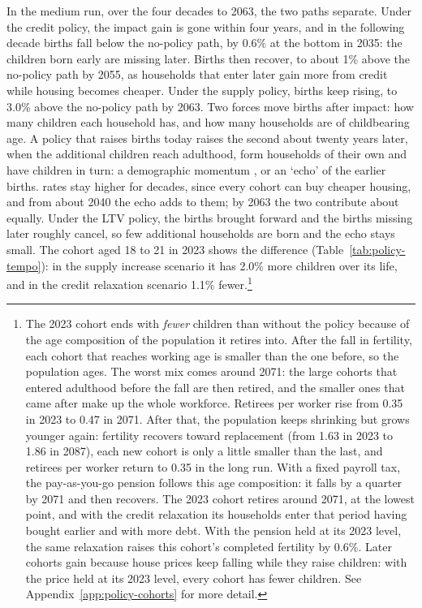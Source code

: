 In the medium run, over the four decades to 2063, the two paths separate.
Under the credit policy, the impact gain is gone within four years, and in the following decade
births fall below the no-policy path, by 0.6\% at the bottom in 2035: the
children born early are missing later. Births then recover, to about 1\% above
the no-policy path by 2055, as households that enter later gain more from
credit while housing becomes cheaper. Under the supply policy, births keep rising, to
3.0\% above the no-policy path by 2063. Two forces move births after impact:
how many children each household has, and how many households are of
childbearing age. A policy that raises births today raises the second about
twenty years later, when the additional children reach adulthood, form
households of their own and have children in turn: a demographic momentum
\citep{keyfitzMomentum1971}, or an `echo' of the earlier births.
rates stay higher for decades, since every cohort can buy cheaper housing, and
from about 2040 the echo adds to them; by 2063 the two contribute about
equally. Under the LTV policy, the births brought forward and the births missing later
roughly cancel, so few additional households are born and the echo stays
small. The cohort aged 18 to 21 in 2023 shows the difference
(Table~\ref{tab:policy-tempo}): in the supply increase scenario it has 2.0\% more children over
its life, and in the credit relaxation scenario 1.1\% fewer.\footnote{The 2023 cohort ends with \emph{fewer} children than
without the policy because of the age composition of the population it
retires into. After the fall in fertility, each cohort that reaches working
age is smaller than the one before, so the population ages. The worst mix
comes around 2071: the large cohorts that entered adulthood before the fall
are then retired, and the smaller ones that came after make up the whole
workforce. Retirees per worker rise from 0.35 in 2023 to 0.47 in 2071. After
that, the population keeps shrinking but grows younger again: fertility
recovers toward replacement (from 1.63 in 2023 to 1.86 in 2087), each new
cohort is only a little smaller than the last, and retirees per worker return
to 0.35 in the long run. With a fixed payroll tax, the pay-as-you-go pension
follows this age composition: it falls by a quarter by 2071 and then
recovers. The 2023 cohort retires around 2071, at the lowest point, and with
the credit relaxation its households enter that period having bought earlier
and with more debt. With the pension held at its 2023 level, the same
relaxation raises this cohort's completed fertility by 0.6\%. Later cohorts
gain because house prices keep falling while they raise children: with the
price held at its 2023 level, every cohort has fewer children. See
Appendix~\ref{app:policy-cohorts} for more detail.}
